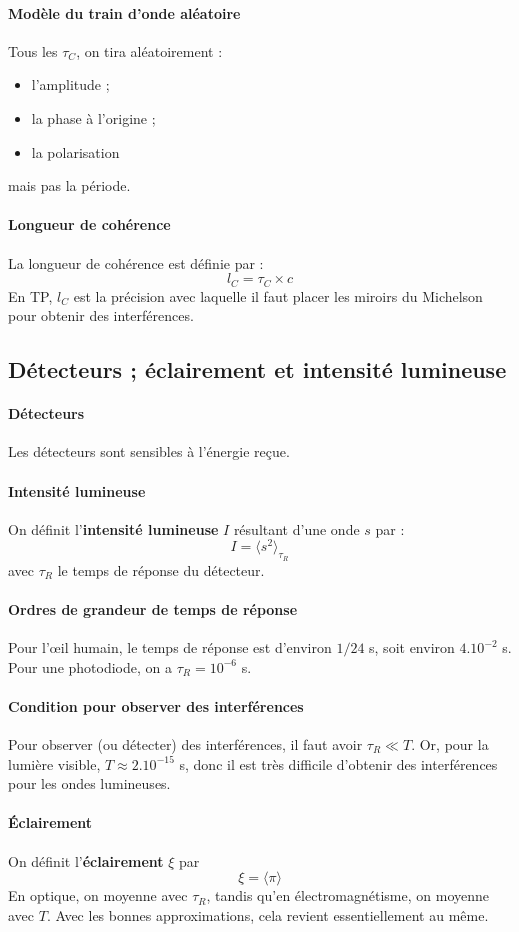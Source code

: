 \documentclass[french]{book}
\theoremstyle{plain}
\theoremstyle{definition}
\theoremstyle{remark}
\begin{document}
\paragraph{Modèle du train d'onde aléatoire} Tous les $\tau_C$, on tira aléatoirement :
\begin{itemize}
	\item l'amplitude ;
	\item la phase à l'origine ;
	\item la polarisation
\end{itemize} mais pas la période.
\paragraph{Longueur de cohérence} La longueur de cohérence est définie par : $$l_C=\tau_C\times c$$ En TP, $l_C$ est la précision avec laquelle il faut placer les miroirs du Michelson pour obtenir des interférences.
\subsection{Détecteurs ; éclairement et intensité lumineuse}
\paragraph{Détecteurs} Les détecteurs sont sensibles à l'énergie reçue. 
\paragraph{Intensité lumineuse }On définit l'\textbf{intensité lumineuse} $I$ résultant d'une onde $s$ par : $$I=\langle s^2\rangle_{\tau_R}$$ avec $\tau_R$ le temps de réponse du détecteur.
\paragraph{Ordres de grandeur de temps de réponse} Pour l'œil humain, le temps de réponse est d'environ $1/24$ s, soit environ $4.10^{-2}$ s. Pour une photodiode, on a $\tau_R=10^{-6}$ s.
\paragraph{Condition pour observer des interférences} Pour observer (ou détecter) des interférences, il faut avoir $\tau_R \ll T$. Or, pour la lumière visible, $T\approx 2.10^{-15}$ s, donc il est très difficile d'obtenir des interférences pour les ondes lumineuses.
\paragraph{Éclairement} On définit l'\textbf{éclairement} $\xi$ par $$\xi=\langle \pi\rangle$$ En optique, on moyenne avec $\tau_R$, tandis qu'en électromagnétisme, on moyenne avec $T$. Avec les bonnes approximations, cela revient essentiellement au même.
\end{document}
